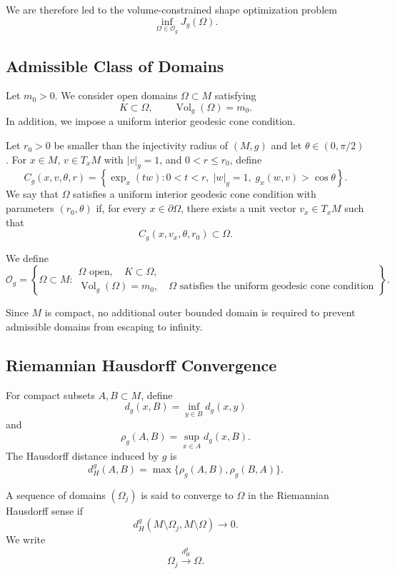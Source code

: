 \documentclass[11pt,a4paper]{article}
\theoremstyle{definition}
\theoremstyle{remark}
\newcommand{\Og}{\mathcal{O}_g}
\newcommand{\Vol}{\operatorname{Vol}_g}
\newcommand{\normg}[1]{\lvert #1\rvert_g}
\begin{document}
We are therefore led to the volume-constrained shape optimization
problem
\begin{equation}
\inf_{\Omega\in\Og}J_g(\Omega).
\label{eq:shape-optimization}
\end{equation}

\subsection{Admissible Class of Domains}

Let $m_0>0$. We consider open domains $\Omega\subset M$ satisfying
\[
K\subset\Omega,
\qquad
\Vol(\Omega)=m_0.
\]
In addition, we impose a uniform interior geodesic cone condition.

Let $r_0>0$ be smaller than the injectivity radius of $(M,g)$ and
let $\theta\in(0,\pi/2)$. For $x\in M$, $v\in T_xM$ with
$\normg v=1$, and $0<r\leq r_0$, define
\[
C_g(x,v,\theta,r)
=
\left\{
\exp_x(tw):
0<t<r,\;
\normg w=1,\;
g_x(w,v)>\cos\theta
\right\}.
\]
We say that $\Omega$ satisfies a uniform interior geodesic cone
condition with parameters $(r_0,\theta)$ if, for every
$x\in\partial\Omega$, there exists a unit vector $v_x\in T_xM$ such
that
\[
C_g(x,v_x,\theta,r_0)\subset\Omega.
\]

We define
\[
\Og
=
\left\{
\Omega\subset M:
\begin{array}{l}
\Omega\text{ open},\quad K\subset\Omega,\\
\Vol(\Omega)=m_0,\quad
\Omega\text{ satisfies the uniform geodesic cone condition}
\end{array}
\right\}.
\]

Since $M$ is compact, no additional outer bounded domain is required
to prevent admissible domains from escaping to infinity.

\subsection{Riemannian Hausdorff Convergence}

For compact subsets $A,B\subset M$, define
\[
d_g(x,B)=\inf_{y\in B}d_g(x,y)
\]
and
\[
\rho_g(A,B)=\sup_{x\in A}d_g(x,B).
\]
The Hausdorff distance induced by $g$ is
\[
d_H^g(A,B)
=
\max\{\rho_g(A,B),\rho_g(B,A)\}.
\]

A sequence of domains $(\Omega_j)$ is said to converge to $\Omega$ in
the Riemannian Hausdorff sense if
\begin{equation}
d_H^g(M\setminus\Omega_j,M\setminus\Omega)\longrightarrow0.
\label{eq:hausdorff-convergence}
\end{equation}
We write
\[
\Omega_j\xrightarrow{d_H^g}\Omega.
\]
\end{document}
